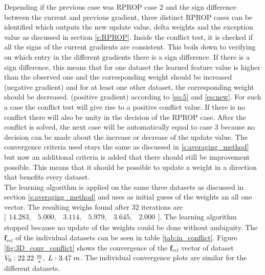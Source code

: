 Depending if the previous case was RPROP case 2 and the sign difference between the current and previous gradient, three distinct RPROP cases can be identified which outputs the new update value, delta weights and the exception value as discussed in section \ref{s:RPROP}. Inside the conflict test, it is checked if all the signs of the current gradients are consistent. This boils down to verifying on which entry in the different gradients there is a sign difference. If there is a sign difference, this means that for one dataset the learned feature value is higher than the observed one and the corresponding weight should be increased (negative gradient) and for at least one other dataset, the corresponding weight should be decreased. (positive gradient) according to \ref{eq:5} and \ref{eq:new}. For such a case the conflict test will give rise to a positive conflict value. If there is no conflict there will also be unity in the decision of the RPROP case. After the conflict is solved, the next case will be automatically equal to case 3 because no decision can be made about the increase or decrease of the update value. The convergence criteria used stays the same as discussed in \ref{s:averaging_method} but now an additional criteria is added that there should still be improvement possible. This means that it should be possible to update a weight in a direction that benefits every dataset.\\

The learning algorithm is applied on the same three datasets as discussed in section \ref{s:averaging_method} and uses as initial guess of the weights an all one vector. The resulting weighs found after $32$ iterations are  $\bigl[ \begin{smallmatrix} 14.283,&5.000,&3.114,&5.979,&3.645,&2.000\end{smallmatrix}\bigr]$. The learning algorithm stopped because no update of the weights could be done without ambiguity. The $\bm{f}_{rel}$ of the individual datasets can be seen in table \ref{tab:in_conflict}. Figure \ref{fig:3D_conv_conflict} shows the convergence of the $\bm{f}_{rel}$ vector of dataset $V_0:22.22\hspace{1mm}\frac{m}{s},\hspace{1mm} L:3.47\hspace{1mm}m$. The individual convergence plots are similar for the different datasets.

